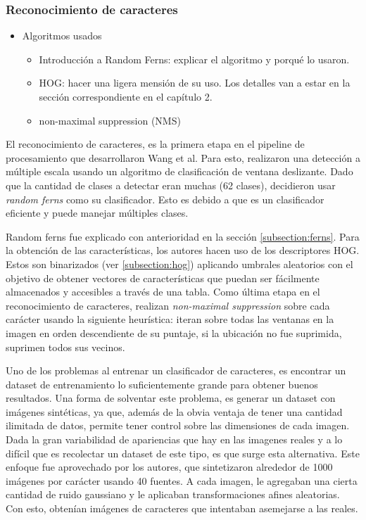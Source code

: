 \subsubsection{Reconocimiento de caracteres}

	\begin{itemize}
		\item Algoritmos usados
			\begin{itemize}
				\item Introducción a Random Ferns: explicar el algoritmo y porqué lo usaron.
				\item HOG: hacer una ligera mensión de su uso. Los detalles van a estar en la sección correspondiente en el capítulo 2.
				\item non-maximal suppression (NMS) 
			\end{itemize}
	\end{itemize}
	
	
	El reconocimiento de caracteres, es la primera etapa en el pipeline de procesamiento que desarrollaron Wang et al. Para esto, realizaron una detección a múltiple escala usando un algoritmo de clasificación de ventana deslizante. Dado que la cantidad de clases a detectar eran muchas (62 clases), decidieron usar \textit{random ferns} como su clasificador. Esto es debido a que es un clasificador eficiente y puede manejar múltiples clases.
	
	Random ferns fue explicado con anterioridad en la sección \ref{subsection:ferns}. Para la obtención de las características, los autores hacen uso de los descriptores HOG. Estos son binarizados (ver \ref{subsection:hog}) aplicando umbrales aleatorios con el objetivo de obtener vectores de características que puedan ser fácilmente almacenados y accesibles a través de una tabla. Como última etapa en el reconocimiento de caracteres, realizan \textit{non-maximal suppression} sobre cada carácter usando la siguiente heurística: iteran sobre todas las ventanas en la imagen en orden descendiente de su puntaje, si la ubicación no fue suprimida, suprimen todos sus vecinos.
	
	Uno de los problemas al entrenar un clasificador de caracteres, es encontrar un dataset de entrenamiento lo suficientemente grande para obtener buenos resultados. Una forma de solventar este problema, es generar un dataset con imágenes sintéticas, ya que, además de la  obvia ventaja de tener una cantidad ilimitada de datos, permite tener control sobre las dimensiones de cada imagen. Dada la gran variabilidad de apariencias que hay en las imagenes reales y a lo difícil que es recolectar un dataset de este tipo, es que surge esta alternativa. Este enfoque fue aprovechado por los autores, que sintetizaron alrededor de 1000 imágenes por carácter usando 40 fuentes. A cada imagen, le agregaban una cierta cantidad de ruido gaussiano y le aplicaban transformaciones afines aleatorias. Con esto, obtenían imágenes de caracteres que intentaban asemejarse a las reales.

	

